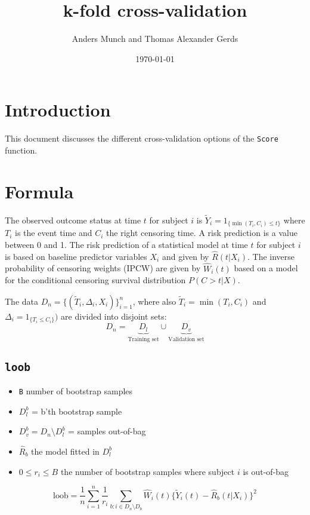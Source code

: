 \documentclass{article}
\author{Anders Munch and Thomas Alexander Gerds}
\affil{University of Copenhagen, Department of Public Health, Section of Biostatistics, Copenhagen, Denmark}
\date{\today}
\title{k-fold cross-validation}
\begin{document}
\maketitle

\section{Introduction}
\label{sec:orga4e7d65}

This document discusses the different cross-validation options of the
\texttt{Score} function.

\section{Formula}
\label{sec:org1e0d079}

The observed outcome status at time \(t\) for subject \(i\) is
\(\tilde Y_i=1_{\{\min(T_i,C_i)\le t\}}\) where \(T_i\) is the event
time and \(C_i\) the right censoring time. A risk prediction is a
value between 0 and 1. The risk prediction of a statistical model at
time \(t\) for subject \(i\) is based on baseline predictor variables
\(X_i\) and given by \(\hat R(t|X_i)\). The inverse probability of
censoring weights (IPCW) are given by \(\hat W_i(t)\) based on a model for
the conditional censoring survival distribution \(P(C> t|X)\).

The data \(D_n=\{(\tilde T_i,\Delta_i,X_i)\}_{i=1}^n\), where also
\(\tilde T_i=\min (T_i,C_i)\) and \(\Delta_i=1_{\{T_i\le C_i\}})\) are
divided into disjoint sets:
\begin{equation*}
D_n = \underbrace{D_l}_{\text{Training set}} \cup \underbrace{D_v}_{\text{Validation set}}
\end{equation*}

\subsection{\texttt{loob}}
\label{sec:org3f74de5}

\begin{itemize}
\item \texttt{B} number of bootstrap samples
\item \(D_l^b\) = b'th bootstrap sample
\item \(D_v^b=D_n \setminus D_l^b\)  = samples out-of-bag
\item \(\hat R_b\) the model fitted in \(D_l^b\)
\item \(0\le r_i \le B\) the number of bootstrap samples where subject \(i\) is out-of-bag
\end{itemize}
\begin{equation*}
\text{loob}=\frac 1 n \sum_{i=1}^n\frac{1}{r_i}
\sum_{b: i\in D_n\setminus D_b}\hat W_i(t) \{\tilde Y_i(t)-\hat
R_b(t|X_i)\}^2
\end{equation*}
\end{document}
